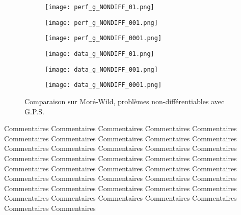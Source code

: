 \documentclass[letterpaper]{scrartcl}
\begin{document}
\begin{figure}[!htb] %
	\begin{subfigure}{0.48\textwidth}
		\texttt{[image: perf\_g\_NONDIFF\_01.png]}
	\end{subfigure}\hspace*{\fill}
	\begin{subfigure}{0.48\textwidth}
		\texttt{[image: perf\_g\_NONDIFF\_001.png]}
	\end{subfigure}
	\medskip
	\begin{subfigure}{0.48\textwidth}
		\texttt{[image: perf\_g\_NONDIFF\_0001.png]}
	\end{subfigure}\hspace*{\fill}
	\begin{subfigure}{0.48\textwidth}
		\texttt{[image: data\_g\_NONDIFF\_01.png]}
	\end{subfigure}
	\medskip
	\begin{subfigure}{0.48\textwidth}
		\texttt{[image: data\_g\_NONDIFF\_001.png]}
	\end{subfigure}\hspace*{\fill}
	\begin{subfigure}{0.48\textwidth}
		\texttt{[image: data\_g\_NONDIFF\_0001.png]}
	\end{subfigure}
	\caption{Comparaison sur Moré-Wild, problèmes non-différentiables avec G.P.S.} \label{fig:6}
\end{figure}
\clearpage
Commentaires Commentaires Commentaires Commentaires Commentaires Commentaires Commentaires Commentaires Commentaires Commentaires Commentaires Commentaires Commentaires Commentaires Commentaires Commentaires Commentaires Commentaires Commentaires Commentaires Commentaires Commentaires Commentaires Commentaires Commentaires Commentaires Commentaires Commentaires Commentaires Commentaires Commentaires Commentaires Commentaires Commentaires Commentaires Commentaires Commentaires Commentaires Commentaires Commentaires Commentaires Commentaires  
\clearpage
\end{document}
